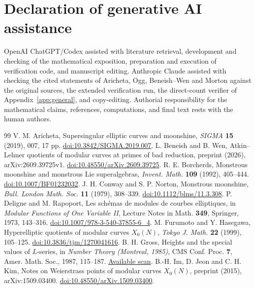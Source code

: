 \documentclass[11pt,a4paper]{article}
\theoremstyle{remark}\newtheorem{remark}[theorem]{Remark}
\numberwithin{equation}{section}
\begin{document}
\section*{Declaration of generative AI assistance}
OpenAI ChatGPT/Codex assisted with literature retrieval, development and checking of the mathematical exposition, preparation and execution of verification code, and manuscript editing. Anthropic Claude assisted with checking the cited statements of Aricheta, Ogg, Beneish--Wen and Morton against the original sources, the extended verification run, the direct-count verifier of Appendix~\ref{app:general}, and copy-editing. Authorial responsibility for the mathematical claims, references, computations, and final text rests with the human authors.

\begin{thebibliography}{99}\small
{} V. M. Aricheta, Supersingular elliptic curves and moonshine, \emph{SIGMA} \textbf{15} (2019), 007, 17 pp. \href{https://doi.org/10.3842/SIGMA.2019.007}{doi:10.3842/SIGMA.2019.007}.
 L. Beneish and B. Wen, Atkin--Lehner quotients of modular curves at primes of bad reduction, preprint (2026), arXiv:2609.39725v1. \href{https://doi.org/10.48550/arXiv.2609.39725}{doi:10.48550/arXiv.2609.39725}.
 R. E. Borcherds, Monstrous moonshine and monstrous Lie superalgebras, \emph{Invent. Math.} \textbf{109} (1992), 405--444. \href{https://doi.org/10.1007/BF01232032}{doi:10.1007/BF01232032}.
 J. H. Conway and S. P. Norton, Monstrous moonshine, \emph{Bull. London Math. Soc.} \textbf{11} (1979), 308--339. \href{https://doi.org/10.1112/blms/11.3.308}{doi:10.1112/blms/11.3.308}.
 P. Deligne and M. Rapoport, Les sch\'emas de modules de courbes elliptiques, in \emph{Modular Functions of One Variable II}, Lecture Notes in Math. \textbf{349}, Springer, 1973, 143--316. \href{https://doi.org/10.1007/978-3-540-37855-6_4}{doi:10.1007/978-3-540-37855-6\_4}.
 M. Furumoto and Y. Hasegawa, Hyperelliptic quotients of modular curves $X_0(N)$, \emph{Tokyo J. Math.} \textbf{22} (1999), 105--125. \href{https://doi.org/10.3836/tjm/1270041616}{doi:10.3836/tjm/1270041616}.
 B. H. Gross, Heights and the special values of $L$-series, in \emph{Number Theory (Montreal, 1985)}, CMS Conf. Proc. \textbf{7}, Amer. Math. Soc., 1987, 115--187. \href{https://wstein.org/papers/bib/Gross-Heights_and_the_Special_Values_of_L-series.pdf}{Available scan}.
 B.-H. Im, D. Jeon and C. H. Kim, Notes on Weierstrass points of modular curves $X_0(N)$, preprint (2015), arXiv:1509.03400. \href{https://doi.org/10.48550/arXiv.1509.03400}{doi:10.48550/arXiv.1509.03400}.

\end{thebibliography}
\end{document}
